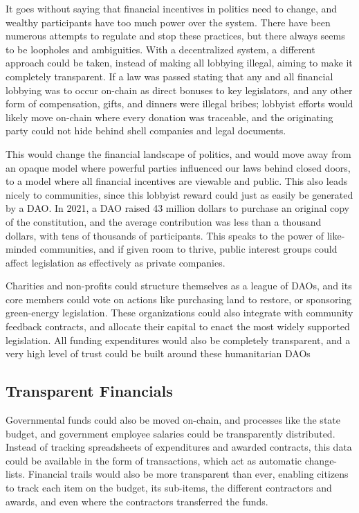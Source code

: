 \documentclass[letterpaper,twocolumn]{article}
\begin{document}
It goes without saying that financial incentives in politics need to change, and wealthy participants have too much power over the system.  There have been numerous attempts to regulate and stop these practices, but there always seems to be loopholes and ambiguities.  With a decentralized system, a different approach could be taken, instead of making all lobbying illegal, aiming to make it completely transparent.  If a law was passed stating that any and all financial lobbying was to occur on-chain as direct bonuses to key legislators, and any other form of compensation, gifts, and dinners were illegal bribes; lobbyist efforts would likely move on-chain where every donation was traceable, and the originating party could not hide behind shell companies and legal documents.  

This would change the financial landscape of politics, and would move away from an opaque model where powerful parties influenced our laws behind closed doors, to a model where all financial incentives are viewable and public.  This also leads nicely to communities, since this lobbyist reward could just as easily be generated by a DAO.  In 2021, a DAO raised 43 million dollars to purchase an original copy of the constitution, and the average contribution was less than a thousand dollars, with tens of thousands of participants.  This speaks to the power of like-minded communities, and if given room to thrive, public interest groups could affect legislation as effectively as private companies.

Charities and non-profits could structure themselves as a league of DAOs, and its core members could vote on actions like purchasing land to restore, or sponsoring green-energy legislation.  These organizations could also integrate with community feedback contracts, and allocate their capital to enact the most widely supported legislation.  All funding expenditures would also be completely transparent, and a very high level of trust could be built around these humanitarian DAOs

\subsection*{Transparent Financials}

Governmental funds could also be moved on-chain, and processes like the state budget, and government employee salaries could be transparently distributed.  Instead of tracking spreadsheets of expenditures and awarded contracts, this data could be available in the form of transactions, which act as automatic change-lists.  Financial trails would also be more transparent than ever, enabling citizens to track each item on the budget, its sub-items, the different contractors and awards, and even where the contractors transferred the funds. 
\end{document}
